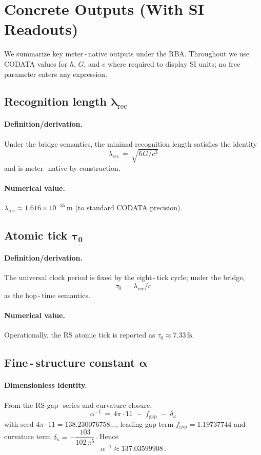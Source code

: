 \documentclass[11pt]{article}
\newcommand{\lamrec}{\lambda_{\mathrm{rec}}}
\newcommand{\tauzero}{\tau_{0}}
\theoremstyle{remark}
\begin{document}
\section{Concrete Outputs (With SI Readouts)}
We summarize key meter\,\mbox{-}\,native outputs under the RBA. Throughout we use CODATA values for $\hbar$, $G$, and $c$ where required to display SI units; no free parameter enters any expression.

\subsection*{Recognition length $\boldsymbol{\lamrec}$}
\paragraph{Definition/derivation.}
Under the bridge semantics, the minimal recognition length satisfies the identity
\[
  \boxed{\;\lamrec \,=\, \sqrt{\hbar G/ c^{3}}\;}
\]
and is meter\,\mbox{-}\,native by construction.
\paragraph{Numerical value.}
\(\lamrec \approx 1.616\times 10^{-35}\,\mathrm{m}\) (to standard CODATA precision).

\subsection*{Atomic tick $\boldsymbol{\tauzero}$}
\paragraph{Definition/derivation.}
The universal clock period is fixed by the eight\,\mbox{-}\,tick cycle; under the bridge,
\[
  \boxed{\;\tauzero \,=\, \lamrec/ c\;}
\]
as the hop\,\mbox{-}\,time semantics.
\paragraph{Numerical value.}
Operationally, the RS atomic tick is reported as \(\tauzero \approx 7.33\,\mathrm{fs}\).

\subsection*{Fine\,\mbox{-}\,structure constant $\boldsymbol{\alpha}$}
\paragraph{Dimensionless identity.}
From the RS gap\,\mbox{-}\,series and curvature closure,
\[
  \boxed{\;\alpha^{-1} \,=\, 4\pi\cdot 11\; -\; f_{\mathrm{gap}}\; -\; \delta_{\kappa}\;}
\]
with seed $4\pi\cdot 11 = 138.230076758\ldots$, leading gap term \(f_{\mathrm{gap}} = 1.19737744\) and curvature term \(\delta_{\kappa} = -\dfrac{103}{102\,\pi^{5}}\). Hence
\[
  \alpha^{-1} \approx 137.03599908\,.
\]
\end{document}
